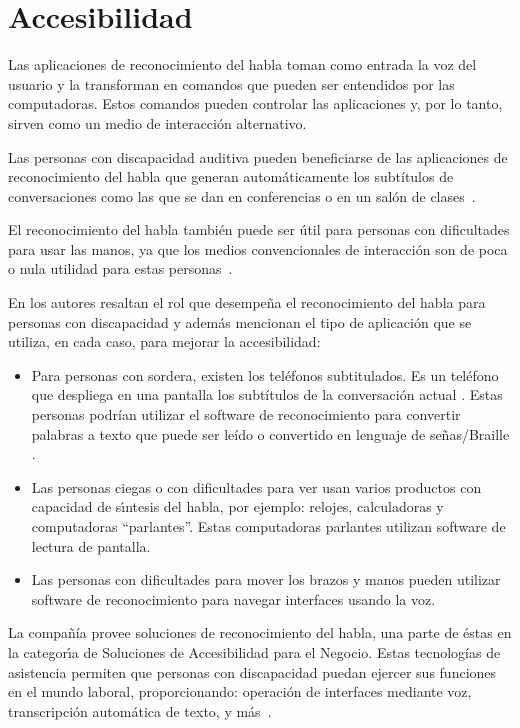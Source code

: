 \section{Accesibilidad}
\label{sec:accesibilidad}

Las aplicaciones de reconocimiento del habla toman como entrada la voz del usuario y la transforman en
comandos que pueden ser entendidos por las computadoras. Estos comandos pueden controlar las aplicaciones
y, por lo tanto, sirven como un medio de interacci\'on alternativo.

Las personas con discapacidad auditiva pueden beneficiarse de las aplicaciones de reconocimiento 
del habla que generan autom\'aticamente los subt\'itulos de conversaciones como las que se 
dan en conferencias o en un sal\'on de \mbox{clases \cite{LeitchHow2002}.}

El reconocimiento del habla tambi\'en puede ser \'util para personas con dificultades para usar las 
manos, ya que los medios convencionales de interacci\'on son de poca o nula utilidad para estas
\mbox{personas \cite{AnanthiSurvey2013}.}

En \cite{AnanthiSurvey2013} los autores resaltan el rol que desempe\~na el reconocimiento del habla 
para personas con discapacidad y adem\'as mencionan el tipo de aplicaci\'on que se utiliza, en cada caso, para mejorar la accesibilidad:

\begin{itemize}
    \item Para personas con sordera, existen los tel\'efonos subtitulados. Es un tel\'efono que despliega
    en una pantalla los subt\'itulos de la conversaci\'on actual \cite{PerfettiReading2000}. Estas personas
    podr\'ian utilizar el software de reconocimiento para convertir palabras a texto que puede ser le\'ido 
    o convertido en lenguaje de se\~nas/Braille \cite{SchilperoordNonverbatim2005}.
    \item Las personas ciegas o con dificultades para ver usan varios productos con capacidad de 
    s{\'\i}ntesis del habla, por ejemplo: relojes, calculadoras y computadoras ``parlantes''. 
    Estas computadoras parlantes utilizan software de lectura de pantalla.
    \item Las personas con dificultades para mover los brazos y manos pueden utilizar software de 
    reconocimiento para navegar interfaces usando la voz\cite{AnanthiSurvey2013}.
\end{itemize}

La compa\~n\'ia  provee soluciones de reconocimiento del habla, una parte de \'estas 
en la categor{\'\i}a de Soluciones de Accesibilidad para el Negocio. Estas tecnolog\'ias de asistencia 
permiten que personas con discapacidad puedan ejercer sus funciones en el mundo laboral,
proporcionando: operaci\'on de interfaces mediante voz, transcripci\'on autom\'atica de texto,
y \mbox{m\'as \cite{NuanceAccessibility}.}
